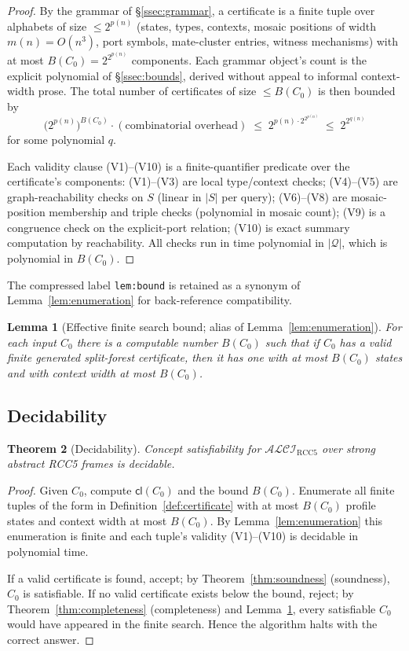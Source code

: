 \documentclass[11pt]{article}
\newtheorem{theorem}{Theorem}[section]
\newtheorem{lemma}[theorem]{Lemma}
\newcommand{\Logic}{\mathcal{ALCI}_{\mathrm{RCC5}}}
\newcommand{\Cl}{\mathsf{cl}}
\newcommand{\Q}{\mathcal Q}
\begin{document}
\begin{proof}
By the grammar of \S\ref{ssec:grammar}, a certificate is a finite
tuple over alphabets of size $\le 2^{p(n)}$ (states, types,
contexts, mosaic positions of width $m(n)=O(n^3)$, port symbols,
mate-cluster entries, witness mechanisms) with at most
$B(C_0)=2^{2^{p(n)}}$ components.  Each grammar object's count is
the explicit polynomial of \S\ref{ssec:bounds}, derived without
appeal to informal context-width prose.  The total number of
certificates of size $\le B(C_0)$ is then bounded by
\[
  \bigl(2^{p(n)}\bigr)^{B(C_0)}\cdot(\text{combinatorial overhead})
  \;\le\; 2^{p(n)\cdot 2^{2^{p(n)}}}
  \;\le\; 2^{2^{q(n)}}
\]
for some polynomial $q$.

Each validity clause (V1)--(V10) is a finite-quantifier predicate
over the certificate's components: (V1)--(V3) are local
type/context checks; (V4)--(V5) are graph-reachability checks on $S$
(linear in $|S|$ per query); (V6)--(V8) are mosaic-position
membership and triple checks (polynomial in mosaic count); (V9) is a
congruence check on the explicit-port relation; (V10) is exact
summary computation by reachability.  All checks run in time
polynomial in $|\Q|$, which is polynomial in $B(C_0)$.
\end{proof}

The compressed label \texttt{lem:bound} is retained as a synonym
of Lemma~\ref{lem:enumeration} for back-reference compatibility.
\begin{lemma}[Effective finite search bound; alias of Lemma~\ref{lem:enumeration}]\label{lem:bound}
For each input $C_0$ there is a computable number $B(C_0)$ such that
if $C_0$ has a valid finite generated split-forest certificate, then
it has one with at most $B(C_0)$ states and with context width at
most $B(C_0)$.
\end{lemma}

\subsection{Decidability}
\label{ssec:decidability}

\begin{theorem}[Decidability]\label{thm:decidability}
Concept satisfiability for $\Logic$ over strong abstract RCC5 frames
is decidable.
\end{theorem}

\begin{proof}
Given $C_0$, compute $\Cl(C_0)$ and the bound $B(C_0)$.  Enumerate
all finite tuples of the form in Definition~\ref{def:certificate}
with at most $B(C_0)$ profile states and context width at most
$B(C_0)$.  By Lemma~\ref{lem:enumeration} this enumeration is
finite and each tuple's validity (V1)--(V10) is decidable in
polynomial time.

If a valid certificate is found, accept; by Theorem~\ref{thm:soundness}
(soundness), $C_0$ is satisfiable.  If no valid certificate exists
below the bound, reject; by Theorem~\ref{thm:completeness}
(completeness) and Lemma~\ref{lem:bound}, every satisfiable $C_0$
would have appeared in the finite search.  Hence the algorithm halts
with the correct answer.
\end{proof}
\end{document}
